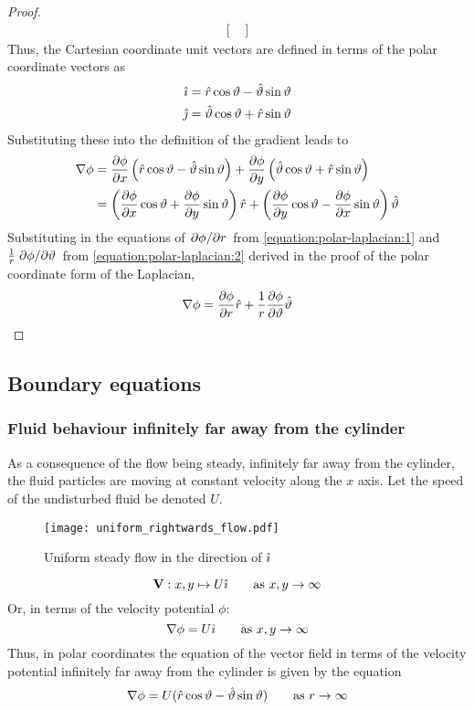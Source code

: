 \begin{lemma}
\begin{proof}
\begin{align*}
\begin{bmatrix}
            \end{bmatrix}
        \end{align*}
        Thus, the Cartesian coordinate unit vectors are defined in terms of the polar coordinate vectors as
        \begin{align*}
            \hat{\imath}&=\hat{r}\cos\vartheta-\hat{\vartheta}\sin\vartheta\\
            \hat{\jmath}&=\hat{\vartheta}\cos\vartheta+\hat{r}\sin\vartheta
        \end{align*}
        Substituting these into the definition of the gradient leads to
        \begin{align*}
            \nabla\phi&=\pdv{\phi}{x}\left(\hat{r}\cos\vartheta-\hat{\vartheta}\sin\vartheta\right)+\pdv{\phi}{y}\left(\hat{\vartheta}\cos\vartheta+\hat{r}\sin\vartheta\right)\\
            &=\left(\pdv{\phi}{x}\cos\vartheta+\pdv{\phi}{y}\sin\vartheta\right)\hat{r}+\left(\pdv{\phi}{y}\cos\vartheta-\pdv{\phi}{x}\sin\vartheta\right)\hat{\vartheta}
        \end{align*}
        Substituting in the equations of $\pdv*{\phi}{r}$ from \eqref{equation:polar-laplacian:1} and $\frac{1}{r}\pdv*{\phi}{\vartheta}$ from \eqref{equation:polar-laplacian:2} derived in the proof of the polar coordinate form of the Laplacian,
        $$
            \nabla\phi=\pdv{\phi}{r}\hat{r}+\frac{1}{r}\pdv{\phi}{\vartheta}\hat{\vartheta}
        $$
    \end{proof}
\end{lemma}

\subsection{Boundary equations}\label{section:BOUNDARY}
\subsubsection{Fluid behaviour infinitely far away from the cylinder}\label{section:INFINITELY-FAR-AWAY}
As a consequence of the flow being steady, infinitely far away from the cylinder, the fluid particles are moving at constant velocity along the $x$ axis. Let the speed of the undisturbed fluid
be denoted $U$.
\begin{figure}
    \texttt{[image: uniform\_rightwards\_flow.pdf]}
    \centering
    \caption{Uniform steady flow in the direction of $\hat{\imath}$}
    \label{figure:STEADY_FLOW}
\end{figure}
$$
    \mathbf{V}:x,y\mapsto U\hat{\imath}\qquad\text{as $x,y\rightarrow\infty$}
$$
Or, in terms of the velocity potential $\phi$:
$$
    \nabla\phi=U\hat{\imath}\qquad\text{as $x,y\rightarrow\infty$}
$$
Thus, in polar coordinates the equation of the vector field in terms of the velocity potential infinitely far away from the cylinder is given by the equation
$$
    \nabla\phi=U(\hat{r}\cos\vartheta-\hat{\vartheta}\sin\vartheta)\qquad\text{as $r\rightarrow\infty$}
$$

